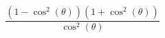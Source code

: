 \documentclass{article}
\begin{document}
\[
\frac{(1-\cos^{2}(\theta))(1+\cos^{2}(\theta))}{\cos^{2}(\theta)}
\]
\end{document}
